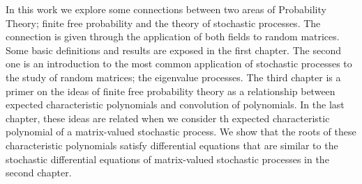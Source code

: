 In this work we explore some connections between two areas of Probability Theory; finite free probability and the theory of stochastic processes. The connection is given through the application of both fields to random matrices. Some basic definitions and results are exposed in the first chapter. The second one is an introduction to the most common application of stochastic processes to the study of random matrices; the eigenvalue processes. The third chapter  is a primer on the ideas of finite free probability theory as a relationship between expected characteristic polynomials and convolution of polynomials. In the last chapter, these ideas are related when we consider th expected characteristic polynomial of a matrix-valued stochastic process. We show that the roots of these characteristic polynomials satisfy differential equations that are similar to the stochastic differential equations of matrix-valued stochastic processes in the second chapter.